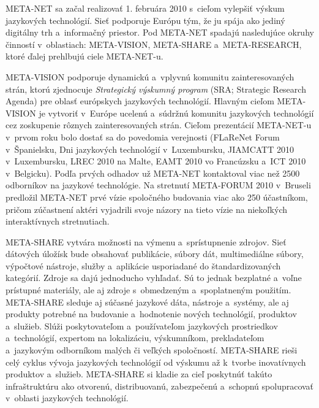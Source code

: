 META-NET sa začal realizovať 1. februára 2010 s~cieľom vylepšiť výskum jazykových technológií. Sieť podporuje Európu tým, že ju spája ako jediný digitálny trh a~informačný priestor. Pod META-NET spadajú nasledujúce okruhy činností v~oblastiach: META-VISION, META-SHARE a~META-RESEARCH, ktoré ďalej prehlbujú ciele META-NET-u.


META-VISION podporuje dynamickú a~vplyvnú komunitu zainteresovaných strán, ktorú zjednocuje \emph{Strategický výskumný program} (SRA; Strategic Research Agenda) pre oblasť európskych jazykových technológií. Hlavným cieľom META-VISION je vytvoriť v~Európe ucelenú a~súdržnú komunitu jazykových technológií cez zoskupenie rôznych zainteresovaných strán. Cieľom prezentácií META-NET-u v~prvom roku bolo dostať sa do povedomia verejnosti (FLaReNet Forum v~Španielsku, Dni jazykových technológií v~Luxembursku, JIAMCATT 2010 v~Luxembursku, LREC 2010 na Malte, EAMT 2010 vo Francúzsku a~ICT 2010 v~Belgicku). Podľa prvých odhadov už META-NET kontaktoval viac než 2500 odborníkov na jazykové technológie. Na stretnutí META-FORUM 2010 v~Bruseli predložil META-NET prvé vízie spoločného budovania viac ako 250 účastníkom, pričom zúčastnení aktéri vyjadrili svoje názory na tieto vízie na niekoľkých interaktívnych stretnutiach.

META-SHARE vytvára možnosti na výmenu a~sprístupnenie zdrojov. Sieť dátových úložísk bude obsahovať publikácie, súbory dát, multimediálne súbory, výpočtové nástroje, služby a~aplikácie usporiadané do štandardizovaných kategórií. Zdroje sa dajú jednoducho vyhľadať. Sú to jednak bezplatné a~voľne prístupné materiály, ale aj zdroje s~obmedzeným a~spoplatneným použitím. META-SHARE sleduje aj súčasné jazykové dáta, nástroje a~systémy, ale aj produkty potrebné na budovanie a~hodnotenie nových technológií, produktov a~služieb. Slúži poskytovateľom a~používateľom jazykových prostriedkov a~technológií, expertom na lokalizáciu, výskumníkom, prekladateľom a~jazykovým odborníkom malých či veľkých spoločností. META-SHARE rieši celý cyklus vývoja jazykových technológií od výskumu až k~tvorbe inovatívnych produktov a~služieb. META-SHARE si kladie za cieľ poskytnúť takúto infraštruktúru ako otvorenú, distribuovanú, zabezpečenú a~schopnú spolupracovať v~oblasti jazykových technológií. 


